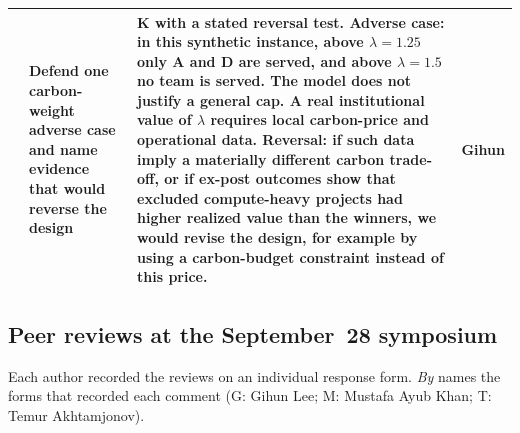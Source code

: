 {\begin{tabularx}{\textwidth}{@{}p{}p{}Yp{0.075\textwidth}@{}}
 & Defend one carbon-weight adverse case and name evidence that would reverse the design & \textbf{K} with a stated reversal test. Adverse case: in this synthetic instance, above $\lambda=1.25$ only A and D are served, and above $\lambda=1.5$ no team is served. The model does not justify a general cap. A real institutional value of $\lambda$ requires local carbon-price and operational data. Reversal: if such data imply a materially different carbon trade-off, or if ex-post outcomes show that excluded compute-heavy projects had higher realized value than the winners, we would revise the design, for example by using a carbon-budget constraint instead of this price. & Gihun \\
\bottomrule
\end{tabularx}}

\subsection{Peer reviews at the September~28 symposium}
Each author recorded the reviews on an individual response form. \emph{By} names the forms that recorded each comment (G: Gihun Lee; M: Mustafa Ayub Khan; T: Temur Akhtamjonov).


